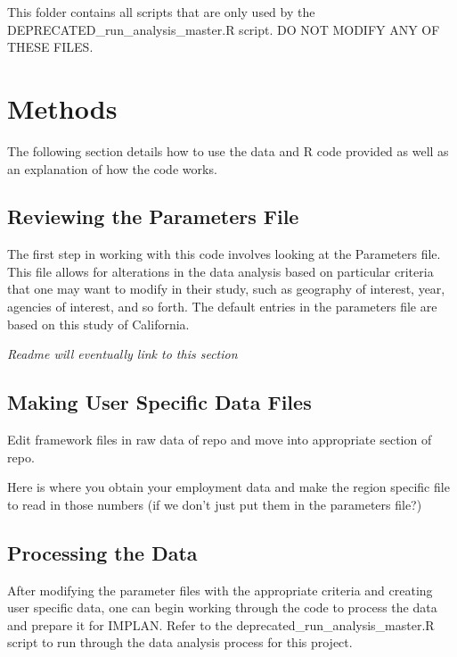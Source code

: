 \documentclass[
]{book}
\begin{document}
This folder contains all scripts that are only used by the DEPRECATED\_run\_analysis\_master.R script. DO NOT MODIFY ANY OF THESE FILES.

\hypertarget{methods}{%
\chapter{Methods}\label{methods}}

The following section details how to use the data and R code provided as well as an explanation of how the code works.

\hypertarget{reviewing-the-parameters-file}{%
\section{Reviewing the Parameters File}\label{reviewing-the-parameters-file}}

The first step in working with this code involves looking at the Parameters file. This file allows for alterations in the data analysis based on particular criteria that one may want to modify in their study, such as geography of interest, year, agencies of interest, and so forth. The default entries in the parameters file are based on this study of California.

\emph{Readme will eventually link to this section}

\hypertarget{making-user-specific-data-files}{%
\section{Making User Specific Data Files}\label{making-user-specific-data-files}}

Edit framework files in raw data of repo and move into appropriate section of repo.

Here is where you obtain your employment data and make the region specific file to read in those numbers (if we don't just put them in the parameters file?)

\hypertarget{processing-the-data}{%
\section{Processing the Data}\label{processing-the-data}}

After modifying the parameter files with the appropriate criteria and creating user specific data, one can begin working through the code to process the data and prepare it for IMPLAN. Refer to the deprecated\_run\_analysis\_master.R script to run through the data analysis process for this project.
\end{document}
